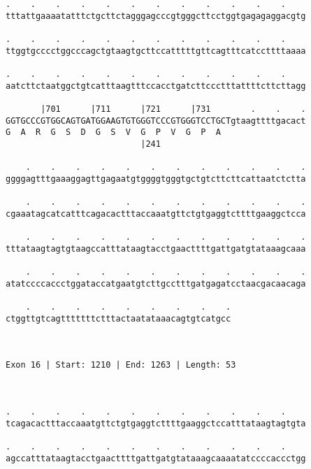 \documentclass{article}
\begin{document}
\begin{Verbatim}
.    .    .    .    .    .    .    .    .    .    .    .    
tttattgaaaatatttctgcttctagggagcccgtgggcttcctggtgagagaggacgtg
                                                            
.    .    .    .    .    .    .    .    .    .    .    .    
ttggtgcccctggcccagctgtaagtgcttccatttttgttcagtttcatccttttaaaa
                                                            
.    .    .    .    .    .    .    .    .    .    .    .    
aatcttctaatggctgtcatttaagtttccacctgatcttccctttattttcttcttagg
                                                            
       |701      |711      |721      |731        .    .    .
GGTGCCCGTGGCAGTGATGGAAGTGTGGGTCCCGTGGGTCCTGCTgtaagttttgacact
G  A  R  G  S  D  G  S  V  G  P  V  G  P  A                 
                           |241                             
  
    .    .    .    .    .    .    .    .    .    .    .    .
ggggagtttgaaaggagttgagaatgtggggtgggtgctgtcttcttcattaatctctta
                                                            
    .    .    .    .    .    .    .    .    .    .    .    .
cgaaatagcatcatttcagacactttaccaaatgttctgtgaggtcttttgaaggctcca
                                                            
    .    .    .    .    .    .    .    .    .    .    .    .
tttataagtagtgtaagccatttataagtacctgaacttttgattgatgtataaagcaaa
                                                            
    .    .    .    .    .    .    .    .    .    .    .    .
atatccccaccctggataccatgaatgtcttgcctttgatgagatcctaacgacaacaga
                                                            
    .    .    .    .    .    .    .    .    .
ctggttgtcagtttttttctttactaatataaacagtgtcatgcc
                                             
                                             
 
Exon 16 | Start: 1210 | End: 1263 | Length: 53



.    .    .    .    .    .    .    .    .    .    .    .    
tcagacactttaccaaatgttctgtgaggtcttttgaaggctccatttataagtagtgta
                                                            
.    .    .    .    .    .    .    .    .    .    .    .    
agccatttataagtacctgaacttttgattgatgtataaagcaaaatatccccaccctgg
                                                            

\end{Verbatim}
\end{document}
